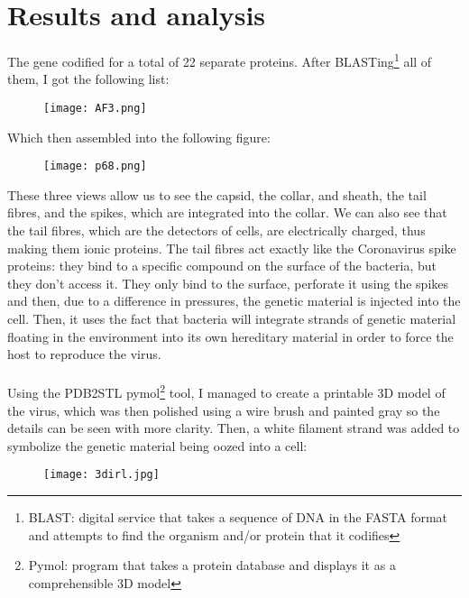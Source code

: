 \section{Results and analysis}
The gene codified for a total of 22 separate proteins. After BLASTing\footnote{BLAST: digital service that takes a sequence of DNA in the FASTA format and attempts to find the organism and/or protein that it codifies} all of them, I got the following list:
\begin{center}\begin{figure}[H]\centering\texttt{[image: AF3.png]}\end{figure}\end{center}
Which then assembled into the following figure:
\begin{center}\begin{figure}[H]\centering\texttt{[image: p68.png]}\end{figure}\end{center}
These three views allow us to see the capsid, the collar, and sheath, the tail fibres, and the spikes, which are integrated into the collar. We can also see that the tail fibres, which are the detectors of cells, are electrically charged, thus making them ionic proteins. The tail fibres act exactly like the Coronavirus spike proteins: they bind to a specific compound on the surface of the bacteria, but they don't access it. They only bind to the surface, perforate it using the spikes and then, due to a difference in pressures, the genetic material is injected into the cell. Then, it uses the fact that bacteria will integrate strands of genetic material floating in the environment into its own hereditary material in order to force the host to reproduce the virus.
\paragraph{}Using the PDB2STL pymol\footnote{Pymol: program that takes a protein database and displays it as a comprehensible 3D model} tool, I managed to create a printable 3D model of the virus, which was then polished using a wire brush and painted gray so the details can be seen with more clarity. Then, a white filament strand was added to symbolize the genetic material being oozed into a cell:
\begin{center}\begin{figure}[H]\centering\texttt{[image: 3dirl.jpg]}\end{figure}\end{center}

